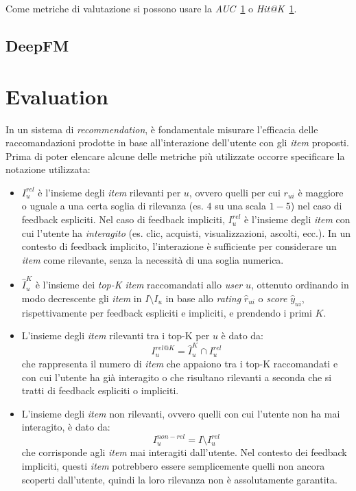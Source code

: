 Come metriche di valutazione si possono usare la \textit{AUC}~\ref{evaluation} o \textit{Hit@K}~\ref{evaluation}.

\subsection{DeepFM}

\section{Evaluation}\label{evaluation}

In un sistema di \textit{recommendation}, è fondamentale misurare l'efficacia delle raccomandazioni prodotte in base all'interazione dell'utente con gli \textit{item} proposti. Prima di poter elencare alcune delle metriche più utilizzate occorre specificare la notazione utilizzata:

\begin{itemize}
    \item $I_u^{rel}$ è l'insieme degli \textit{item} rilevanti per $u$, ovvero quelli per cui $r_{ui}$ è maggiore o uguale a una certa soglia di rilevanza (es. $4$ su una scala $1-5$) nel caso di feedback espliciti. Nel caso di feedback impliciti, $I_u^{rel}$ è l'insieme degli \textit{item} con cui l'utente ha \textit{interagito} (es. clic, acquisti, visualizzazioni, ascolti, ecc.). In un contesto di feedback implicito, l'interazione è sufficiente per considerare un \textit{item} come rilevante, senza la necessità di una soglia numerica.
    \item $\hat{I}_u^K$ è l'insieme dei \textit{top-K item} raccomandati allo \textit{user} $u$, ottenuto ordinando in modo decrescente gli \textit{item} in $I \setminus I_u$ in base allo \textit{rating} $\hat{r}_{ui}$ o \textit{score} $\hat{y}_{ui}$, rispettivamente per feedback espliciti e impliciti, e prendendo i primi $K$.
    \item L'insieme degli \textit{item} rilevanti tra i top-K per $u$ è dato da:
    \[
    I_u^{rel@K} = \hat{I}_u^K \cap I_u^{rel}
    \]
    che rappresenta il numero di \textit{item} che appaiono tra i top-K raccomandati e con cui l'utente ha già interagito o che risultano rilevanti a seconda che si tratti di feedback espliciti o impliciti.
    \item L'insieme degli \textit{item} non rilevanti, ovvero quelli con cui l'utente non ha mai interagito, è dato da:
    \[
    I_u^{non-rel} = I \setminus I_u^{rel}
    \]
    che corrisponde agli \textit{item} mai interagiti dall'utente. Nel contesto dei feedback impliciti, questi \textit{item} potrebbero essere semplicemente quelli non ancora scoperti dall'utente, quindi la loro rilevanza non è assolutamente garantita.
\end{itemize}




